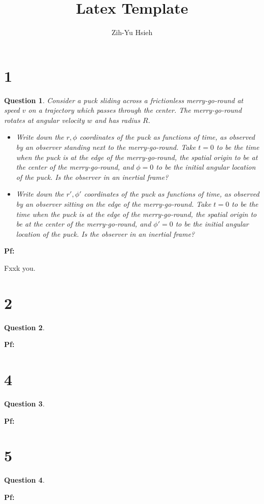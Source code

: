 \documentclass{article}
\title{Latex Template}
\author{Zih-Yu Hsieh}
\newtheorem{question}{Question}
\begin{document}
\maketitle

\section*{1}
\begin{question}\label{q1}
    Consider a puck sliding across a frictionless merry-go-round at speed $v$ on a trajectory which passes through the center. The merry-go-round rotates at angular velocity $w$ and has radius $R$.
    \begin{itemize}
        \item[(a)] Write down the $r,\phi$ coordinates of the puck as functions of time, as observed by an observer standing next to the merry-go-round. Take $t=0$ to be the time when the puck is at the edge of the merry-go-round, the spatial origin to be at the center of the merry-go-round, and $\phi=0$ to be the initial angular location of the puck. Is the observer in an inertial frame?
        \item[(b)] Write down the $r', \phi'$ coordinates of the puck as functions of time, as observed by an observer sitting on the edge of the merry-go-round. Take $t=0$ to be the time when the puck is at the edge of the merry-go-round, the spatial origin to be at the center of the merry-go-round, and $\phi'=0$ to be the initial angular location of the puck. Is the observer in an inertial frame?
    \end{itemize}
\end{question}

\textbf{Pf:}

Fxxk you.

\break

\section*{2}
\begin{question}\label{q2}
    
\end{question}

\textbf{Pf:}

\break

\section*{4}
\begin{question}\label{q4}
    
\end{question}

\textbf{Pf:}

\break

\section*{5}
\begin{question}\label{q5}
    
\end{question}

\textbf{Pf:}

\break
\end{document}
